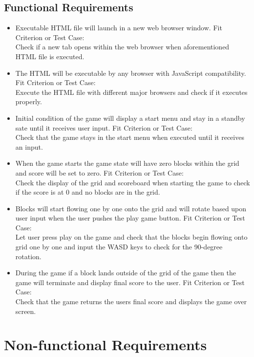 \documentclass[12pt, titlepage]{article}
\begin{document}
\subsection{Functional Requirements}
\begin{itemize}
    \item
    Executable HTML file will launch in a new web browser window.    \subitem
    Fit Criterion or Test Case: \\
    Check if a new tab opens within the web browser when aforementioned HTML file is executed.    
    \item
    The HTML will be executable by any browser with JavaScript compatibility.    \subitem
    Fit Criterion or Test Case: \\
    Execute the HTML file with different major browsers and check if it executes properly.    
    \item
    Initial condition of the game will display a start menu and stay in a standby sate until it receives user input.    \subitem
    Fit Criterion or Test Case: \\
    Check that the game stays in the start menu when executed until it receives an input.    
    \item
    When the game starts the game state will have zero blocks within the grid and score will be set to zero.    \subitem
    Fit Criterion or Test Case: \\
    Check the display of the grid and scoreboard when starting the game to check if the score is at 0 and no blocks are in the grid.    
    \item
    Blocks will start flowing one by one onto the grid and will rotate based upon user input when the user pushes the play game button.    \subitem
    Fit Criterion or Test Case: \\
    Let user press play on the game and check that the blocks begin flowing onto grid one by one and input the WASD keys to check for the 90-degree rotation.    
    \item
    During the game if a block lands outside of the grid of the game then the game will terminate and display final score to the user.    \subitem
    Fit Criterion or Test Case: \\
    Check that the game returns the users final score and displays the game over screen.    
    \end{itemize}
    



\section{Non-functional Requirements}
\end{document}
